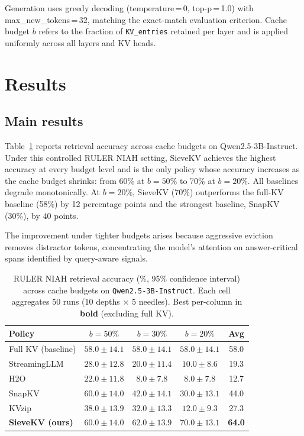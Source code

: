 \documentclass[runningheads]{llncs}
\begin{document}
Generation uses greedy decoding (temperature\,=\,0, top-p\,=\,1.0) with
max\_new\_tokens\,=\,32, matching the exact-match evaluation criterion.
Cache budget $b$ refers to the fraction of \texttt{KV\_entries} retained per
layer and is applied uniformly across all layers and KV heads.

\section{Results}
\label{sec:results}

\subsection{Main results}
\label{sec:main}

Table~\ref{tab:main} reports retrieval accuracy across cache budgets on
Qwen2.5-3B-Instruct.
Under this controlled RULER NIAH setting, SieveKV achieves the highest
accuracy at every budget level and is the only policy whose accuracy
increases as the cache budget shrinks: from 60\% at $b{=}50\%$ to 70\%
at $b{=}20\%$.
All baselines degrade monotonically.
At $b{=}20\%$, SieveKV (70\%) outperforms the full-KV baseline
(58\%) by 12 percentage points and the strongest baseline, SnapKV (30\%),
by 40 points.

The improvement under tighter budgets arises because aggressive eviction
removes distractor tokens, concentrating the model's attention on
answer-critical spans identified by query-aware signals.

\begin{table}[htbp]
\caption{RULER NIAH retrieval accuracy (\%, 95\% confidence interval) across
cache budgets on \texttt{Qwen2.5-3B-Instruct}.
Each cell aggregates 50 runs (10 depths $\times$ 5 needles).
Best per-column in \textbf{bold} (excluding full KV).}
\label{tab:main}
\centering
\begin{tabular}{lcccc}
\toprule
Policy & $b{=}50\%$ & $b{=}30\%$ & $b{=}20\%$ & Avg \\
\midrule
Full KV (baseline)                           & $58.0\pm14.1$ & $58.0\pm14.1$ & $58.0\pm14.1$ & 58.0 \\
\midrule
StreamingLLM~\cite{xiao2023streamingllm} & $28.0\pm12.8$ & $20.0\pm11.4$ & $10.0\pm8.6$ & 19.3 \\
H2O~\cite{zhang2023h2o}                  & $22.0\pm11.8$ & $8.0\pm7.8$ & $8.0\pm7.8$ & 12.7 \\
SnapKV~\cite{li2024snapkv}               & $60.0\pm14.0$ & $42.0\pm14.1$ & $30.0\pm13.1$ & 44.0 \\
KVzip~\cite{he2025kvzip}                 & $38.0\pm13.9$ & $32.0\pm13.3$ & $12.0\pm9.3$ & 27.3 \\
\textbf{SieveKV (ours)}                    & $\mathbf{60.0\pm14.0}$ & $\mathbf{62.0\pm13.9}$ & $\mathbf{70.0\pm13.1}$ & \textbf{64.0} \\
\bottomrule
\end{tabular}
\end{table}
\end{document}
